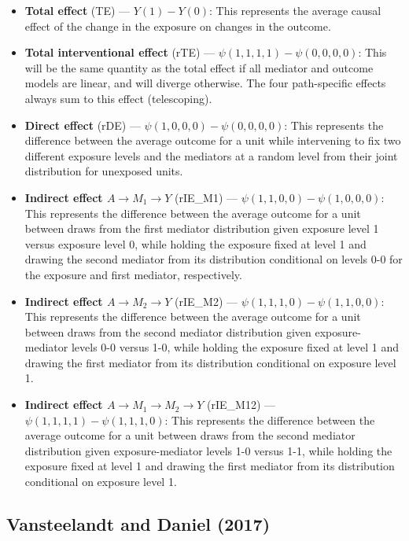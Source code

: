 \documentclass[12pt]{article} %
\numberwithin{equation}{section} %
\begin{document}
\begin{itemize}
\item \textbf{Total effect} (TE) --- $Y(1) - Y(0)$: This represents the average causal effect of the change in the exposure 
on changes in the outcome. 
\item \textbf{Total interventional effect} (rTE) --- $\psi(1,1,1,1) - \psi(0,0,0,0)$: This will be the same quantity as the 
total effect if all mediator and outcome models are linear, and will diverge otherwise. The four path-specific effects always
sum to this effect (telescoping). 
\item \textbf{Direct effect} (rDE) --- $\psi(1,0,0,0) - \psi(0,0,0,0)$: This represents the difference between the average outcome
for a unit while intervening to fix two different exposure levels and the mediators at a random level from their joint distribution for
unexposed units.  
\item \textbf{Indirect effect $A \rightarrow M_{1} \rightarrow Y$} (rIE\_M1) --- $\psi(1,1,0,0) - \psi(1,0,0,0)$: This represents 
the difference between the average outcome for a unit between draws from the first mediator distribution given exposure level 1
versus exposure level 0, while holding the exposure fixed at level 1 and drawing the second mediator from its distribution conditional
on levels 0-0 for the exposure and first mediator, respectively. 
\item \textbf{Indirect effect $A \rightarrow M_{2} \rightarrow Y$} (rIE\_M2) --- $\psi(1,1,1,0) - \psi(1,1,0,0)$: This represents 
the difference between the average outcome for a unit between draws from the second mediator distribution given exposure-mediator levels 0-0
versus 1-0, while holding the exposure fixed at level 1 and drawing the first mediator from its distribution conditional
on exposure level 1.
\item \textbf{Indirect effect $A \rightarrow M_{1} \rightarrow M_{2} \rightarrow Y$} (rIE\_M12) --- $\psi(1,1,1,1) - \psi(1,1,1,0)$: This represents 
the difference between the average outcome for a unit between draws from the second mediator distribution given exposure-mediator levels 1-0
versus 1-1, while holding the exposure fixed at level 1 and drawing the first mediator from its distribution conditional
on exposure level 1. 
\end{itemize}


\subsection{Vansteelandt and Daniel (2017)}
\end{document}
